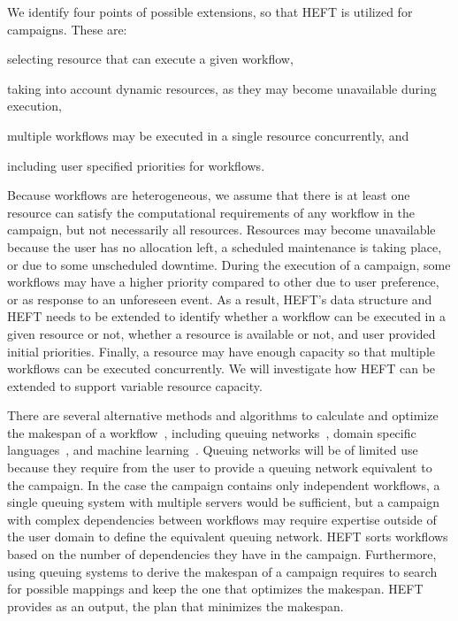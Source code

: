 We identify four points of possible extensions, so that HEFT is utilized for campaigns.
These are:
\begin{inparaenum}[(i)]
    \item selecting resource that can execute a given workflow,
    \item taking into account dynamic resources, as they may become unavailable during execution,
    \item multiple workflows may be executed in a single resource concurrently, and
    \item including user specified priorities for workflows.
\end{inparaenum}
Because workflows are heterogeneous, we assume that there is at least one resource can satisfy the computational requirements of any workflow in the campaign, but not necessarily all resources.
Resources may become unavailable because the user has no allocation left, a scheduled maintenance is taking place, or due to some unscheduled downtime.
During the execution of a campaign, some workflows may have a higher priority compared to other due to user preference, or as response to an unforeseen event.
As a result, HEFT's data structure and HEFT needs to be extended to identify whether a workflow can be executed in a given resource or not, whether a resource is available or not, and user provided initial priorities.
Finally, a resource may have enough capacity so that multiple workflows can be executed concurrently.
We will investigate how HEFT can be extended to support variable resource capacity.

There are several alternative methods and algorithms to calculate and optimize the makespan of a workflow~\cite{lu2019review}, including queuing networks~\cite{yao2019throughput,bao2019performance}, domain specific languages~\cite{carothers2017durango,maheshwari2016workflow}, and machine learning~\cite{witt2019predictive,pumma2017runtime}.
Queuing networks will be of limited use because they require from the user to provide a queuing network equivalent to the campaign.
In the case the campaign contains only independent workflows, a single queuing system with multiple servers would be sufficient, but a campaign with complex dependencies between workflows may require expertise outside of the user domain to define the equivalent queuing network.
HEFT sorts workflows based on the number of dependencies they have in the campaign.
Furthermore, using queuing systems to derive the makespan of a campaign requires to search for possible mappings and keep the one that optimizes the makespan.
HEFT provides as an output, the plan that minimizes the makespan.

